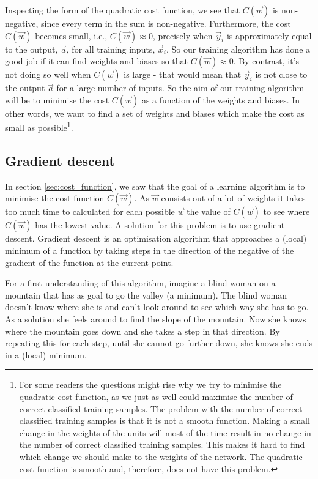 Inspecting the form of the quadratic cost function, we see that $C(\vec{w})$ is non-negative, since every term in the sum is non-negative. Furthermore, the cost $C(\vec{w})$ becomes small, i.e., $C(\vec{w})\approx 0$, precisely when $\vec{y}_i$ is approximately equal to the output, $\vec{a}$, for all training inputs, $\vec{x}_i$. So our training algorithm has done a good job if it can find weights and biases so that $C(\vec{w})\approx0$. By contrast, it's not doing so well when $C(\vec{w})$ is large - that would mean that $\vec{y}_i$ is not close to the output $\vec{a}$ for a large number of inputs. So the aim of our training algorithm will be to minimise the cost $C(\vec{w})$ as a function of the weights and biases. In other words, we want to find a set of weights and biases which make the cost as small as possible\footnote{For some readers the questions might rise why we try to minimise the quadratic cost function, as we just as well could maximise the number of correct classified training samples. The problem with the number of correct classified training samples is that it is not a smooth function. Making a small change in the weights of the units will most of the time result in no change in the number of correct classified training samples. This makes it hard to find which change we should make to the weights of the network. The quadratic cost function is smooth and, therefore, does not have this problem.}.

\subsection{Gradient descent}\label{sec:gradient}
In section \ref{sec:cost_function}, we saw that the goal of a learning algorithm is to minimise the cost function $C(\vec{w})$. As $\vec{w}$ consists out of a lot of weights it takes too much time to calculated for each possible $\vec{w}$ the value of $C(\vec{w})$ to see where $C(\vec{w})$ has the lowest value. A solution for this problem is to use gradient descent. Gradient descent is an optimisation algorithm that approaches a (local) minimum of a function by taking steps in the direction of the negative of the gradient of the function at the current point.

For a first understanding of this algorithm, imagine a blind woman on a mountain that has as goal to go the valley (a minimum). The blind woman doesn't know where she is and can't look around to see which way she has to go. As a solution she feels around to find the slope of the mountain. Now she knows where the mountain goes down and she takes a step in that direction. By repeating this for each step, until she cannot go further down, she knows she ends in a (local) minimum.

